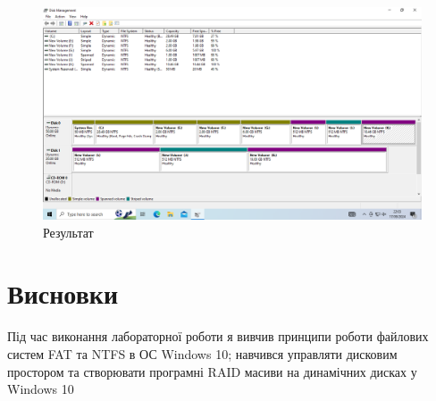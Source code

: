 \documentclass[oneside,14pt]{extarticle}
\begin{document}
\begin{normalsize}
	\begin{figure}[H]
		\centering
		\includegraphics[scale=0.4]{18}
		\caption{Результат}
	\end{figure}
	
	\section*{Висновки}
	Під час виконання лабораторної роботи я вивчив принципи роботи файлових систем FAT та NTFS в
	ОС Windows 10; навчився управляти дисковим простором та створювати
	програмні RAID масиви на динамічних дисках у Windows 10
		    
\end{normalsize}
\end{document}
